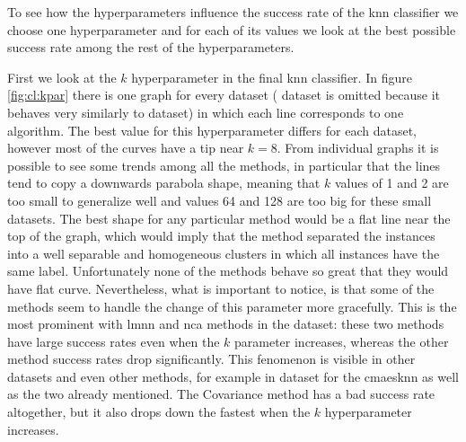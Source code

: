 \documentclass[12pt,a4paper]{report}
\begin{document}


To see how the hyperparameters influence the success rate of the \ac{knn} classifier we choose one hyperparameter and for each of its values we look at the best possible success rate among the rest of the hyperparameters.

First we look at the $k$ hyperparameter in the final \ac{knn} classifier. In figure \ref{fig:cl:kpar} there is one graph for every dataset ( dataset is omitted because it behaves very similarly to  dataset) in which each line corresponds to one algorithm. The best value for this hyperparameter differs for each dataset, however most of the curves have a tip near $k=8$. From individual graphs it is possible to see some trends among all the methods, in particular that the lines tend to copy a downwards parabola shape, meaning that $k$ values of 1 and 2 are too small to generalize well and values 64 and 128 are too big for these small datasets. The best shape for any particular method would be a flat line near the top of the graph, which would imply that the method separated the instances into a well separable and homogeneous clusters in which all instances have the same label. Unfortunately none of the methods behave so great that they would have flat curve. Nevertheless, what is important to notice, is that some of the methods seem to handle the change of this parameter more gracefully. This is the most prominent with \ac{lmnn} and \ac{nca} methods in the  dataset: these two methods have large success rates even when the $k$ parameter increases, whereas the other method success rates drop significantly. This fenomenon is visible in other datasets and even other methods, for example in  dataset for the \ac{cmaesknn} as well as the two already mentioned. The Covariance method has a bad success rate altogether, but it also drops down the fastest when the $k$ hyperparameter increases.

\end{document}
